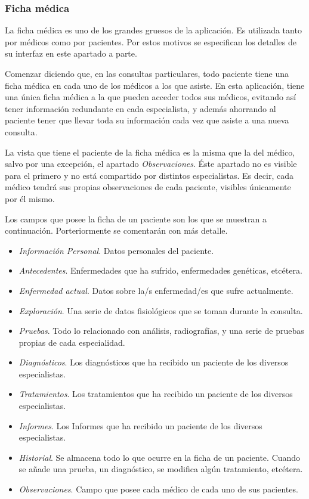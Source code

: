 \documentclass[a4paper,oneside,11pt]{book}
\begin{document}
		
	
	
	\subsubsection{Ficha médica} %
		\label{sub:ficha_medica}
	
		La ficha médica es uno de los grandes gruesos de la aplicación. Es utilizada tanto por médicos como por pacientes. Por estos motivos se especifican los detalles de su interfaz en este apartado a parte.
		
		Comenzar diciendo que, en las consultas particulares, todo paciente tiene una ficha médica en cada uno de los médicos a los que asiste. En esta aplicación, tiene una única ficha médica a la que pueden acceder todos sus médicos, evitando así tener información redundante en cada especialista, y además ahorrando al paciente tener que llevar toda su información cada vez que asiste a una nueva consulta.
		
		La vista que tiene el paciente de la ficha médica es la misma que la del médico, salvo por una excepción, el apartado \textit{Observaciones}. Éste apartado no es visible para el primero y no está compartido por distintos especialistas. Es decir, cada médico tendrá sus propias observaciones de cada paciente, visibles únicamente por él mismo. 
		
		Los campos que posee la ficha de un paciente son los que se muestran a continuación. Porteriormente se comentarán con más detalle.
		
		\begin{itemize}
			\item \textit{Información Personal}. Datos personales del paciente.
			\item \textit{Antecedentes}. Enfermedades que ha sufrido, enfermedades genéticas, etcétera.
			\item \textit{Enfermedad actual}. Datos sobre la/s enfermedad/es que sufre actualmente.
			\item \textit{Exploración}. Una serie de datos fisiológicos que se toman durante la consulta.
			\item \textit{Pruebas}. Todo lo relacionado con análisis, radiografías, y una serie de pruebas propias de cada especialidad.
			\item \textit{Diagnósticos}. Los diagnósticos que ha recibido un paciente de los diversos especialistas.
			\item \textit{Tratamientos}. Los tratamientos que ha recibido un paciente de los diversos especialistas.
			\item \textit{Informes}. Los Informes que ha recibido un paciente de los diversos especialistas.
			\item \textit{Historial}. Se almacena todo lo que ocurre en la ficha de un paciente. Cuando se añade una prueba, un diagnóstico, se modifica algún tratamiento, etcétera.
			\item \textit{Observaciones}. Campo que posee cada médico de cada uno de sus pacientes.
		\end{itemize}
		
\end{document}
